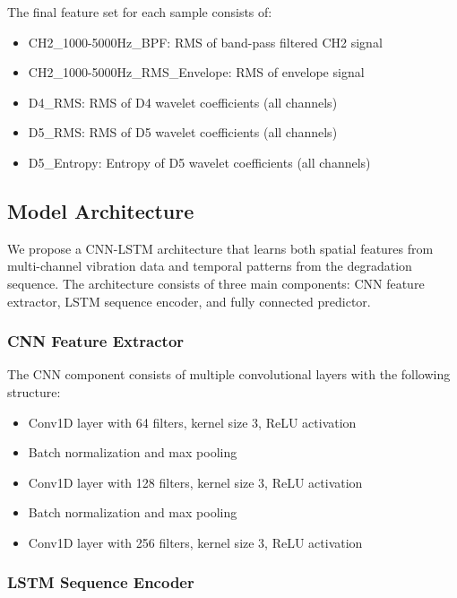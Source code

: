 \documentclass[conference,twocolumn]{IEEEtran}
\begin{document}
The final feature set for each sample consists of:
\begin{itemize}
    \item CH2\_1000-5000Hz\_BPF: RMS of band-pass filtered CH2 signal
    \item CH2\_1000-5000Hz\_RMS\_Envelope: RMS of envelope signal
    \item D4\_RMS: RMS of D4 wavelet coefficients (all channels)
    \item D5\_RMS: RMS of D5 wavelet coefficients (all channels)
    \item D5\_Entropy: Entropy of D5 wavelet coefficients (all channels)
\end{itemize}

\subsection{Model Architecture}

We propose a CNN-LSTM architecture that learns both spatial features from multi-channel vibration data and temporal patterns from the degradation sequence. The architecture consists of three main components: CNN feature extractor, LSTM sequence encoder, and fully connected predictor.

\subsubsection{CNN Feature Extractor}

The CNN component consists of multiple convolutional layers with the following structure:
\begin{itemize}
    \item Conv1D layer with 64 filters, kernel size 3, ReLU activation
    \item Batch normalization and max pooling
    \item Conv1D layer with 128 filters, kernel size 3, ReLU activation
    \item Batch normalization and max pooling
    \item Conv1D layer with 256 filters, kernel size 3, ReLU activation
\end{itemize}

\subsubsection{LSTM Sequence Encoder}
\end{document}
